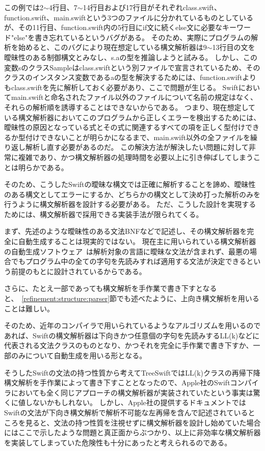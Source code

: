 この例では2$\sim$4行目、7$\sim$14行目および17行目がそれぞれclass.swift、function.swift、main.swiftという3つのファイルに分かれているものとしているが、その11行目、function.swift内の5行目にif文に続くelse文に必要なキーワード"else"を書き忘れているというバグがある。
そのため、実際にプログラムの解析を始めると、このバグにより現在想定している構文解析器は9$\sim$13行目の文を曖昧性のある制御構文とみなし、s.aの型を推論しようと試みる。
しかし、この変数sのクラスSampleはclass.swiftという別ファイルで宣言されているため、そのクラスのインスタンス変数であるaの型を解決するためには、function.swiftよりもclass.swiftを先に解析しておく必要があり、ここで問題が生じる。
Swiftにおいてmain.swiftと命名されたファイル以外のファイルについて名前の規定はなく、それらの解析順を誘導することはできないからである。
つまり、現在想定している構文解析器においてこのプログラムから正しくエラーを検出するためには、曖昧性の原因となっている式とその式に関連するすべての項を正しく型付けできるか型付けできないことが明らかになるまで、main.swift以外の全ファイルを繰り返し解析し直す必要があるのだ。
この解決方法が解決したい問題に対して非常に複雑であり、かつ構文解析器の処理時間を必要以上に引き伸ばしてしまうことは明らかである。

そのため、こうしたSwiftの曖昧な構文では正確に解析することを諦め、曖昧性のある構文としてエラーにするか、どちらかの構文として決め打った解析のみを行うように構文解析器を設計する必要がある。
ただ、こうした設計を実現するためには、構文解析器で採用できる実装手法が限られてくる。

まず、先述のような曖昧性のある文法BNFなどで記述し、その構文解析器を完全に自動生成することは現実的ではない。
現在主に用いられている構文解析器の自動生成ソフトウェア~\cite{antlr}は解析対象の言語に曖昧な文法が含まれず、最悪の場合でもプログラム中の全ての字句を先読みすれば適用する文法が決定できるという前提のもとに設計されているからである。

さらに、たとえ一部であっても構文解析を手作業で書き下すとなると、~\ref{refinement:structure:parser}節でも述べたように、上向き構文解析を用いることは難しい。

そのため、近年のコンパイラで用いられているようなアルゴリズムを用いるのであれば、Swiftの構文解析器は下向きかつ任意個の字句を先読みするLL(k)などに代表される文法クラスのものとなり、かつそれを完全に手作業で書き下すか、一部のみについて自動生成を用いる形となる。

そうしたSwiftの文法の持つ性質から考えてTreeSwiftではLL(k)クラスの再帰下降構文解析を手作業によって書き下すこととなったので、Apple社のSwiftコンパイラにおいても全く同じアプローチの構文解析器が実装されていたという事実は驚くに値しないかもしれない。
しかし、Apple社の提供するドキュメントではSwiftの文法が下向き構文解析で解析不可能な左再帰を含んで記述されているところを見ると、文法の持つ性質を注視せずに構文解析器を設計し始めていた場合にはここで示したような問題と真正面からぶつかり、以上に非効率な構文解析器を実装してしまっていた危険性も十分にあったと考えられるのである。

